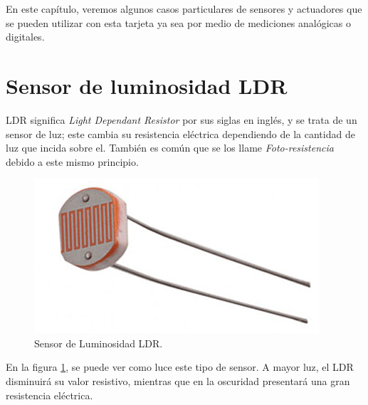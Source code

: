 \documentclass[letterpaper, 10pt]{report}
\begin{document}
En este capítulo, veremos algunos casos particulares de sensores y actuadores que se pueden utilizar con esta tarjeta ya sea por medio de mediciones analógicas o digitales.

\section{Sensor de luminosidad LDR}

LDR significa \emph{Light Dependant Resistor} por sus siglas en inglés, y se trata de un sensor de luz; este cambia su resistencia eléctrica dependiendo de la cantidad de luz que incida sobre el. También es común que se los llame \emph{Foto-resistencia} debido a este mismo principio.

\begin{figure}[h]
\centering
\includegraphics[scale=0.4]{LDR-Resistor.png}
\caption{Sensor de Luminosidad LDR. \label{LDR}}
\end{figure}

En la figura \ref{LDR}, se puede ver como luce este tipo de sensor. A mayor luz, el LDR disminuirá su valor resistivo, mientras que en la oscuridad presentará una gran resistencia eléctrica.
\end{document}

